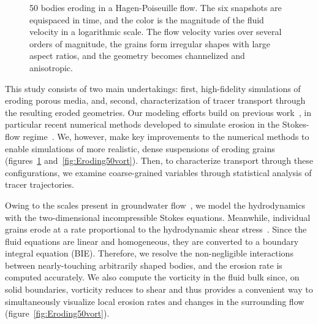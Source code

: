 \documentclass{jfm}
\begin{document}
\begin{figure}
\begin{center}
\caption{\label{fig:Eroding50vel} 50 bodies eroding in a
Hagen-Poiseuille flow.  The six snapshots are equispaced in time, and
the color is the magnitude of the fluid velocity in a logarithmic scale.
The flow velocity varies over several orders of magnitude, the grains
form irregular shapes with large aspect ratios, and the geometry becomes
channelized and anisotropic.}
\end{center}
\end{figure}

This study consists of two main undertakings: first, high-fidelity
simulations of eroding porous media, and, second, characterization of
tracer transport through the resulting eroded geometries. Our modeling
efforts build on previous work~\citep{ris-moo-chi-she-zha2012,
moore2013self, moo2017}, in particular recent numerical methods
developed to simulate erosion in the Stokes-flow
regime~\citep{qua-moo2018}. We, however, make key improvements to the
numerical methods to enable simulations of more realistic, dense
suspensions of eroding grains (figures~\ref{fig:Eroding50vel}
and~\ref{fig:Eroding50vort}).  Then, to characterize transport through
these configurations, we examine coarse-grained variables through
statistical analysis of tracer trajectories.

Owing to the scales present in groundwater flow~\citep{bea1972}, we
model the hydrodynamics with the two-dimensional incompressible Stokes
equations.  Meanwhile, individual grains erode at a rate proportional to
the hydrodynamic shear stress~\citep{wan-fel2004,
ris-moo-chi-she-zha2012, moore2013self, par-izu2000}.  Since the fluid
equations are linear and homogeneous, they are converted to a boundary
integral equation (BIE). Therefore, we resolve the non-negligible
interactions between nearly-touching arbitrarily shaped bodies, and the
erosion rate is computed accurately. We also compute the vorticity in
the fluid bulk since, on solid boundaries, vorticity reduces to shear
and thus provides a convenient way to simultaneously visualize local
erosion rates and changes in the surrounding flow
(figure~\ref{fig:Eroding50vort}).
\end{document}
